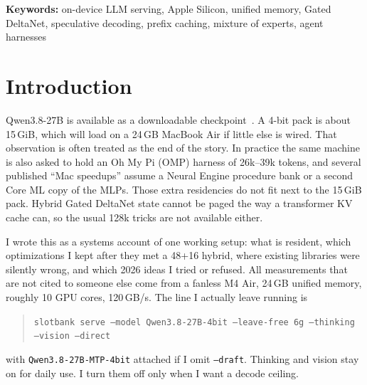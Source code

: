 \begin{abstract}
A dated verification campaign (\S\ref{sec:verify}, campaign \texttt{20260902T001357Z}) maps twenty-four claims to tests. Twenty-one are reproduced on a Linux host with no Metal weights; two Air clocks are pin-checked; two gaps (envelope task quality, fanless soak) are named so they cannot be promoted to results. The filtered pytest tree on that host is 221 passed / 23 skipped. The envelope suite is 29 OMP-shaped prompts and is a structural oracle, not a quality study.
\end{abstract}

\vspace{0.4em}
\noindent\textbf{Keywords:} on-device LLM serving, Apple Silicon, unified memory, Gated DeltaNet, speculative decoding, prefix caching, mixture of experts, agent harnesses

\tableofcontents
\vspace{1em}

\section{Introduction}
\label{sec:intro}

Qwen3.8-27B is available as a downloadable checkpoint~\citep{qwen38card}. A 4-bit pack is about 15\,GiB, which will load on a 24\,GB MacBook Air if little else is wired. That observation is often treated as the end of the story. In practice the same machine is also asked to hold an Oh My Pi (OMP) harness of 26k--39k tokens, and several published ``Mac speedups'' assume a Neural Engine procedure bank or a second Core ML copy of the MLPs. Those extra residencies do not fit next to the 15\,GiB pack. Hybrid Gated DeltaNet state cannot be paged the way a transformer KV cache can, so the usual 128k tricks are not available either.

I wrote this as a systems account of one working setup: what is resident, which optimizations I kept after they met a 48+16 hybrid, where existing libraries were silently wrong, and which 2026 ideas I tried or refused. All measurements that are not cited to someone else come from a fanless M4 Air, 24\,GB unified memory, roughly 10 GPU cores, 120\,GB/s. The line I actually leave running is
\begin{quote}
\texttt{slotbank serve --model Qwen3.8-27B-4bit --leave-free 6g --thinking --vision --direct}
\end{quote}
with \texttt{Qwen3.8-27B-MTP-4bit} attached if I omit \texttt{--draft}. Thinking and vision stay on for daily use. I turn them off only when I want a decode ceiling.

